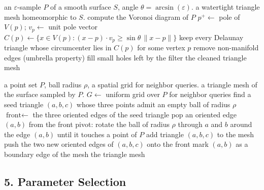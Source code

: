 \begin{algorithm}[htbp]
\caption{Cocone (Amenta--Choi--Dey--Leekha)}
\label{alg:shape_cocone}
\begin{algorithmic}[1]
\Require an $\varepsilon$-sample $P$ of a smooth surface $S$, angle $\theta = \arcsin(\varepsilon)$.
\Ensure a watertight triangle mesh homeomorphic to $S$.
  \State compute the Voronoi diagram of $P$
    \State $p^{+} \gets$ pole of $V(p)$; \quad $v_p \gets$ unit pole vector
    \State $C(p) \gets \{ x \in V(p) : (x - p) \cdot v_p \ge \sin\theta \, \| x - p \| \}$
  \EndFor
  \State keep every Delaunay triangle whose circumcenter lies in $C(p)$ for some vertex $p$
  \State remove non-manifold edges (umbrella property)
  \State fill small holes left by the filter
  \State \Return the cleaned triangle mesh
\EndFunction
\end{algorithmic}
\end{algorithm}

\begin{algorithm}[htbp]
\caption{Ball-Pivoting Algorithm (Bernardini et al.)}
\label{alg:shape_ball_pivoting}
\begin{algorithmic}[1]
\Require a point set $P$, ball radius $\rho$, a spatial grid for neighbor queries.
\Ensure a triangle mesh of the surface sampled by $P$.
  \State $G \gets$ uniform grid over $P$ for neighbor queries
  \State find a seed triangle $(a,b,c)$ whose three points admit an empty ball of radius $\rho$
  \State $\text{front} \gets$ the three oriented edges of the seed triangle
    \State pop an oriented edge $(a,b)$ from the front
    \State pivot: rotate the ball of radius $\rho$ through $a$ and $b$ around
           the edge $(a,b)$ until it touches a point of $P$
      \State add triangle $(a,b,c)$ to the mesh
      \State push the two new oriented edges of $(a,b,c)$ onto the front
    \Else
      \State mark $(a,b)$ as a boundary edge of the mesh
    \EndIf
  \EndWhile
  \State \Return the triangle mesh
\EndFunction
\end{algorithmic}
\end{algorithm}

\subsection{5. Parameter Selection}

